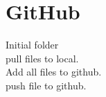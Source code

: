 \chapter{GitHub}

 Initial folder
\\
 pull files to local.\\
 Add all files to github.\\
 push file to github.\\


